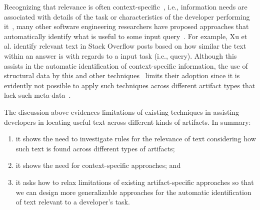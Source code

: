 Recognizing that relevance is often context-specific~\cite{Bavota2016}, i.e., information needs are associated with details of the task 
or characteristics of the developer performing it~\cite{Robillard2015}, many other software engineering researchers 
have proposed approaches that 
automatically identify what is useful to some input query~\cite{Ye2016, silva2019, Xu2017}.
For example, Xu et al. identify relevant text in Stack Overflow posts 
based on how similar the text within an answer is with regards to a input task (i.e., query).
Although this assists in the automatic identification of context-specific information, 
the use of structural data by this and other techniques~\cite{silva2019, Li2018}
limits their adoption since it is evidently
not possible to apply such techniques
across different artifact types that lack such meta-data~\cite{Bavota2016, arnaoudova2015}.
  




The discussion above  evidences limitations of existing techniques 
in assisting developers in locating useful text across different kinds of artifacts.
In summary:

\begin{enumerate}
    \item it shows the need to investigate rules for the relevance of text 
    considering how such text is found across different types of artifacts;
    \item it shows the need for context-specific approaches; and 
    \item it asks how to relax limitations of existing
    artifact-specific approaches so that we can design 
    more generalizable approaches for the automatic identification
    of text relevant to a developer's task.
\end{enumerate}


